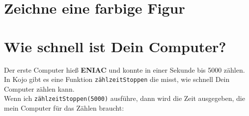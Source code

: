 \chapter{Zeichne eine farbige Figur}

\chapter{Wie schnell ist Dein Computer?}Der erste Computer hieß {\bf ENIAC} und konnte in einer Sekunde bis 5000 zählen.\\
In Kojo gibt es eine Funktion \lstinline{zählzeitStoppen} die misst, wie schnell Dein Computer zählen kann.\\
Wenn ich \lstinline{zählzeitStoppen(5000)} ausführe, dann wird die Zeit ausgegeben, die mein Computer für das Zählen braucht:

